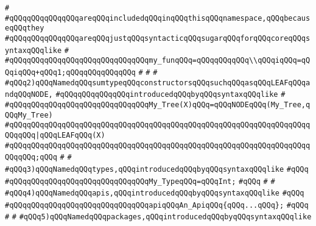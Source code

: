 \verb|#|\newline
\verb|#qQQqqQQqqQQqqQQqareqQQqincludedqQQqinqQQqthisqQQqnamespace,qQQqbecauseqQQqthey|\newline
\verb|#qQQqqQQqqQQqqQQqareqQQqjustqQQqsyntacticqQQqsugarqQQqforqQQqcoreqQQqsyntaxqQQqlike|\newline
\verb|#|\newline
\verb|#qQQqqQQqqQQqqQQqqQQqqQQqqQQqqQQqmy_funqQQq=qQQqqQQqqQQq\\qQQqiqQQq=qQQqiqQQq+qQQq1;qQQqqQQqqQQqqQQq|\newline
\verb|#|\newline
\verb|#|\newline
\verb|#|\newline
\verb|#qQQq2)qQQqNamedqQQqsumtypeqQQqconstructorsqQQqsuchqQQqasqQQqLEAFqQQqandqQQqNODE,|\newline
\verb|#qQQqqQQqqQQqqQQqintroducedqQQqbyqQQqsyntaxqQQqlike|\newline
\verb|#|\newline
\verb|#qQQqqQQqqQQqqQQqqQQqqQQqqQQqqQQqMy_Tree(X)qQQq=qQQqNODEqQQq(My_Tree,qQQqMy_Tree)|\newline
\verb|#qQQqqQQqqQQqqQQqqQQqqQQqqQQqqQQqqQQqqQQqqQQqqQQqqQQqqQQqqQQqqQQqqQQqqQQqqQQq|\verb#|qQQqLEAFqQQq(X)#\newline
\verb|#qQQqqQQqqQQqqQQqqQQqqQQqqQQqqQQqqQQqqQQqqQQqqQQqqQQqqQQqqQQqqQQqqQQqqQQqqQQq;qQQq|\newline
\verb|#|\newline
\verb|#|\newline
\verb|#qQQq3)qQQqNamedqQQqtypes,qQQqintroducedqQQqbyqQQqsyntaxqQQqlike|\newline
\verb|#qQQq|\newline
\verb|#qQQqqQQqqQQqqQQqqQQqqQQqqQQqqQQqMy_TypeqQQq=qQQqInt;|\newline
\verb|#qQQq|\newline
\verb|#|\newline
\verb|#|\newline
\verb|#qQQq4)qQQqNamedqQQqapis,qQQqintroducedqQQqbyqQQqsyntaxqQQqlike|\newline
\verb|#qQQq|\newline
\verb|#qQQqqQQqqQQqqQQqqQQqqQQqqQQqqQQqapiqQQqAn_ApiqQQq{qQQq...qQQq};|\newline
\verb|#qQQq|\newline
\verb|#|\newline
\verb|#|\newline
\verb|#qQQq5)qQQqNamedqQQqpackages,qQQqintroducedqQQqbyqQQqsyntaxqQQqlike|\newline
